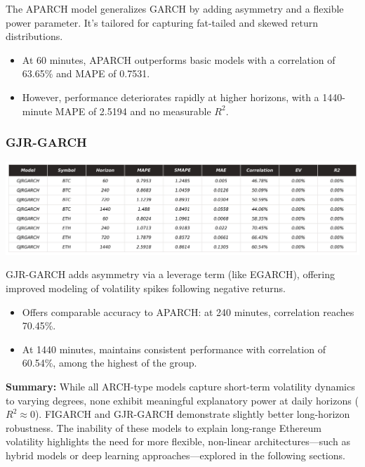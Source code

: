 \documentclass[9pt]{article}
\begin{document}
\begin{multicols}{2}
		The APARCH model generalizes GARCH by adding asymmetry and a flexible power parameter. It’s tailored for capturing fat-tailed and skewed return distributions.
		
		\begin{itemize}
			\item At 60 minutes, APARCH outperforms basic models with a correlation of 63.65\% and MAPE of 0.7531.
			\item However, performance deteriorates rapidly at higher horizons, with a 1440-minute MAPE of 2.5194 and no measurable \( R^2 \).
		\end{itemize}
		
		\subsubsection{GJR-GARCH}
		\centering
		\includegraphics[width=.95\columnwidth]{img/_KPI_GJRGARCH.png}
		\label{fig:_KPI_GJRGARCH}
		\justifying
		\medskip
		
		GJR-GARCH adds asymmetry via a leverage term (like EGARCH), offering improved modeling of volatility spikes following negative returns.
		
		\begin{itemize}
			\item Offers comparable accuracy to APARCH: at 240 minutes, correlation reaches 70.45\%.
			\item At 1440 minutes, maintains consistent performance with correlation of 60.54\%, among the highest of the group.
		\end{itemize}
		
		\textbf{Summary:} While all ARCH-type models capture short-term volatility dynamics to varying degrees, none exhibit meaningful explanatory power at daily horizons (\( R^2 \approx 0 \)). FIGARCH and GJR-GARCH demonstrate slightly better long-horizon robustness. The inability of these models to explain long-range Ethereum volatility highlights the need for more flexible, non-linear architectures—such as hybrid models or deep learning approaches—explored in the following sections.

				
	\end{multicols}
\end{document}
